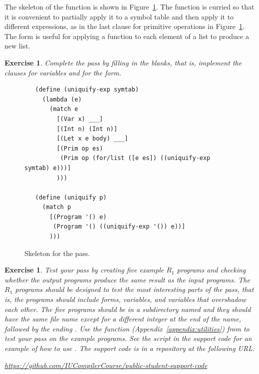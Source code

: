 \documentclass[11pt]{book}
\newtheorem{exercise}[theorem]{Exercise}
\begin{document}
The skeleton of the  function is shown in
Figure~\ref{fig:uniquify-s0}.  The function is curried so that it is
convenient to partially apply it to a symbol table and then apply it
to different expressions, as in the last clause for primitive
operations in Figure~\ref{fig:uniquify-s0}.  The \href{https://docs.racket-lang.org/reference/for.html#%28form._%28%28lib._racket%2Fprivate%2Fbase..rkt%29._for%2Flist%29%29}{\key{for/list}}
form is useful for applying a function to each element of a list to produce
a new list.

\begin{exercise}
\normalfont %

Complete the  pass by filling in the blanks, that is,
implement the clauses for variables and for the  form.
\end{exercise}

\begin{figure}[tbp]
\begin{lstlisting}
   (define (uniquify-exp symtab)
     (lambda (e)
       (match e
         [(Var x) ___]
         [(Int n) (Int n)]
         [(Let x e body) ___]
         [(Prim op es)
          (Prim op (for/list ([e es]) ((uniquify-exp symtab) e)))]
         )))

   (define (uniquify p)
     (match p
       [(Program '() e)
        (Program '() ((uniquify-exp '()) e))]
       )))
\end{lstlisting}
\caption{Skeleton for the  pass.}
\label{fig:uniquify-s0}
\end{figure}

\begin{exercise}
\normalfont %

Test your  pass by creating five example $R_1$ programs
and checking whether the output programs produce the same result as
the input programs. The $R_1$ programs should be designed to test the
most interesting parts of the  pass, that is, the
programs should include  forms, variables, and variables that
overshadow each other.  The five programs should be in a subdirectory
named  and they should have the same file name except for a
different integer at the end of the name, followed by the ending
. Use the  function
(Appendix~\ref{appendix:utilities}) from  to test
your  pass on the example programs.  See the
 script in the support code for an example of how
to use . The support code is in a 
repository at the following URL:
\begin{center}\footnotesize
  \url{https://github.com/IUCompilerCourse/public-student-support-code}
\end{center}
\end{exercise}
\end{document}

